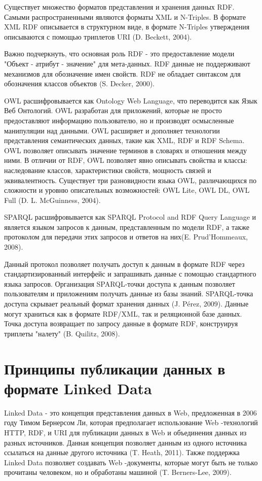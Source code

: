 Существует множество форматов представления и хранения данных RDF. Самыми распространенными являются форматы XML и N-Triples. В формате XML RDF описывается в структурном виде, в формате   N-Triples утверждения описываются с помощью триплетов URI (D. Beckett, 2004). 

Важно подчеркнуть, что основная роль RDF - это предоставление модели "Объект - атрибут - значение" для мета-данных. RDF данные не поддерживают механизмов для обозначение имен свойств. RDF не обладает синтаксом для обозначения классов объектов (S. Decker, 2000). 

OWL расшифровывается как Ontology Web Language, что переводится как Язык Веб Онтологий.  OWL разработан для приложений, которые не просто предоставляют информацию пользователю, но и производят осмысленные манипуляции над данными. OWL расширяет и дополняет технологии представления семантических данных, такие как XML, RDF и RDF Schema. OWL позволяет описывать значение терминов в словарях и отношения между ними. В отличии  от RDF, OWL позволяет явно описывать свойства и классы: наследование классов, характеристики свойств, мощность связей и эквивалентность. Существует три разновидности языка OWL, различающихся по сложности и уровню описательных возможностей: OWL Lite, OWL DL, OWL Full (D. L. McGuinness, 2004). 

SPARQL  расшифровывается как SPARQL Protocol and RDF Query Language и является  языком запросов к данным, представленным по модели RDF, а также протоколом для передачи этих запросов и ответов на них(E. Prud’Hommeaux, 2008). 

Данный протокол позволяет получать доступ к данным в формате RDF через стандартизированный интерфейс и запрашивать данные с помощью стандартного языка запросов. Организация SPARQL-точки доступа к данным позволяет пользователям и приложениям получать данные из базы знаний. SPARQL-точка доступа скрывает реальный формат хранения данных (J. Pérez, 2009). Данные могут храниться как в формате RDF/XML, так и реляционной базе данных. Точка доступа возвращает по запросу данные в формате RDF, конструируя триплеты "налету" (B. Quilitz, 2008).  


\section{Принципы публикации данных в формате Linked Data} \label{sect2_4}

Linked Data - это концепция представления данных в Web, предложенная в 2006 году Тимом Бернерсом Ли, которая предполагает использование Web -технологий HTTP, RDF, и URI для публикации данных в Web и объединения данных из разных источников. Данная концепция позволяет данным из одного источника ссылаться на данные другого источника (T. Heath, 2011). Также поддержка Linked Data позволяет создавать Web -документы, которые могут быть не только прочитаны человеком, но и обработаны машиной (T. Berners-Lee, 2009). 

